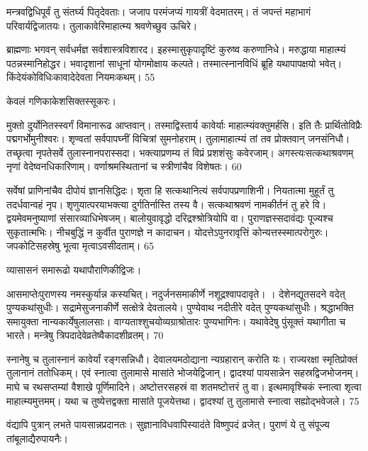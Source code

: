 मन्त्रवद्विधिपूर्वं तु संतर्घ्य पितृदेवताः।
जजाप परमंजप्यं गायत्रीं वेदमातरम्।
तं जपन्तं महाभागं परिवार्यद्विजातयः।
तुलाकावेरिमाहात्म्य श्रवणेच्छुव ऊचिरे।

ब्राह्मणाः
भगवन् सर्वधर्मज्ञ सर्वशास्त्रविशारद।
इहस्मासुकृपादृष्टिं कुरुष्व करुणानिधे।
मरुद्धाया माहात्म्यं पठन्नस्मानिहोद्धर।
भवादृशानां साधूनां योगमोक्षाय कल्पते।
तस्मात्स्नानविधिं ब्रूहि यथापापक्षयो भवेत्।
किंदेयंकोविधिःकावादेदेवता नियमःकथम्।
55

केवलं गणिकाकेशसिक्तस्सूकरः।

मुक्तो दुर्योनितस्स्वर्गं विमानारूढ आप्तवान्।
तस्माद्विस्तार्य कावेर्याः माहात्म्यंवक्तुमर्हसि।
इति तैः प्रार्थितोविप्रैः पद्मगर्भोमुनीश्वरः।
शृण्वतां सर्वपापघ्नीं विचित्रां सुमनोहराम्।
तुलामाहात्म्यं तां तव प्रोक्तवान् जनसंनिधौ।
तच्छृत्वा नृपतेसर्वे तुलास्नानपरास्सदा।
भक्त्याप्रणम्य तं विप्रं प्रशशंसुः कवेरजाम्।
अगस्त्यःसत्कथाश्रवणम् नृणां वेदेष्वनधिकारिणाम्।
वर्णाश्रमस्थितानां च स्त्रीणांचैव विशेषतः।
60

सर्वेषां प्राणिनांचैव दीपोयं ज्ञानसिद्धिदः।
शृता हि सत्कथानित्यं सर्वपापप्रणाशिनी।
नियतात्मा मुहूर्तं तु तदर्धवान्वहं नृप।
शृणुयात्परयाभक्त्या दुर्गतिर्नास्ति तस्य वै।
सत्कथाश्रवणं नामकीर्तनं तु हरे वि।
द्वयमेवमनुष्याणां संसारव्याधिभेषजम्।
बालोयुवावृद्धो दरिद्रश्श्रोत्रियोपि वा।
पुराणज्ञस्सदावंद्यः पूज्यश्च सुकृतात्मभिः।
नीचबुद्धिं न कुर्वीत पुराणज्ञे न कादाचन।
योदत्तेऽपुनरावृत्तिं कोन्यत्तस्स्मात्परोगुरुः।
जपकोटिसहस्रेषु भूत्वा मृत्वाऽवसीदताम्।
65

व्यासासनं समारूढो यथापौराणिकीद्विजः।

आसमाप्तेःपुराणस्य नमस्कुर्यान्न कस्यचित्।
नदुर्जनसमाकीर्णे नशूद्रश्वापदावृते।
।
देशेनद्यूतसदने वदेत् पुण्यकथांसुधीः।
सद्रामेसुजनाकीर्णे सत्क्षेत्रे देवतालये।
पुण्येवाथ नदीतीरे वदेत् पुण्यकथांसुधीः।
श्रद्धाभक्ति समायुक्ता नान्यकार्येषुलालसाः।
वाग्यताश्शुचयोव्यग्राश्रोतारः पुण्यभागिनः।
यथावेदेषु पुंसूक्तं यथागीता च भारते।
मन्त्रेषु त्रिपदादेवेव्रतेष्वैकादशीव्रतम्।
70

स्नानेषु च तुलास्नानं कावेर्यां रङ्गसन्निधौ।
देवालयमठोद्याना न्यग्रहारान् करोति यः।
राज्यरक्षा स्मृतिप्रोक्तं तुलानानं ततोधिकम्।
एवं स्नात्वा तुलामासे मासांते भोजयेद्विजान्।
द्वादश्यां पायसान्नेन सहस्रद्विजभोजनम्।
माघे च रथसप्तम्यां वैशाखे पूर्णिमादिने।
अष्टोत्तरसहस्रं वा शतमष्टोत्तरं तु वा।
इत्थमावृश्चिकं स्नात्वा शृत्वा माहात्म्यमुत्तमम्।
यथा च तुष्येत्तद्वक्ता मासांते पूजयेत्तथा।
द्वादश्यां तु तुलामासे स्नात्वा सह्योद्भवेजले।
75

वंद्यापि पुत्रान् लभते पायसान्नप्रदानतः।
सुज्ञानाविधवापिस्यादंते विष्णुपदं व्रजेत्।
पुराणं ये तु संपूज्य तांबूलाद्यैरुपायनैः।

